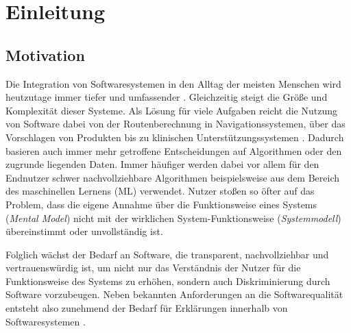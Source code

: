 \chapter{Einleitung}

\section{Motivation}

Die Integration von Softwaresystemen in den Alltag der meisten Menschen wird heutzutage immer tiefer und umfassender \cite{carvalho2020developers}.  Gleichzeitig steigt die Größe und Komplexität dieser Systeme. Als Lösung für viele Aufgaben reicht die Nutzung von Software dabei von der Routenberechnung in Navigationssystemen, über das Vorschlagen von Produkten bis zu klinischen Unterstützungssystemen \cite{chazette2020explainability, tintarev2015explaining, cypko2017guide}. Dadurch basieren auch immer mehr getroffene Entscheidungen auf Algorithmen oder den zugrunde liegenden Daten. Immer häufiger werden dabei vor allem für den Endnutzer schwer nachvollziehbare Algorithmen beispielsweise aus dem Bereich des maschinellen Lernens (ML) verwendet. Nutzer stoßen so öfter auf das Problem, dass die eigene Annahme über die Funktionsweise eines Systems (\textit{Mental Model}) nicht mit der wirklichen System-Funktionsweise (\textit{Systemmodell}) übereinstimmt oder unvollständig ist.

Folglich wächst der Bedarf an Software, die transparent, nachvollziehbar und vertrauenswürdig ist, um nicht nur das Verständnis der Nutzer für die Funktionsweise des Systems zu erhöhen, sondern auch Diskriminierung durch Software vorzubeugen. Neben bekannten Anforderungen an die Softwarequalität \cite{international2011iso} entsteht also zunehmend der Bedarf für Erklärungen innerhalb von Softwaresystemen \cite{chazette_end-users_nodate}.

